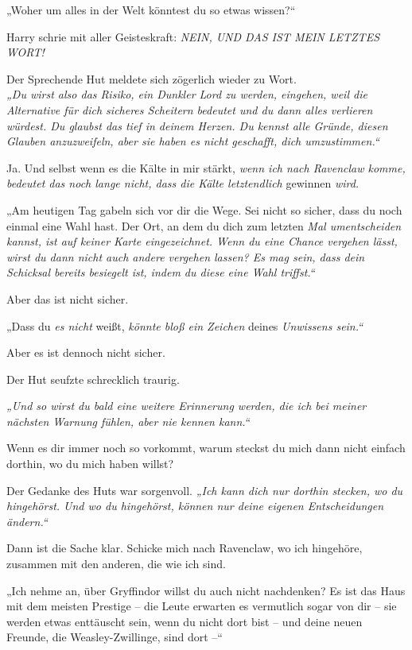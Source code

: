 {„Woher um alles in der Welt könntest du so etwas wissen?“

Harry schrie mit aller Geisteskraft: \emph{NEIN, UND DAS IST MEIN LETZTES WORT!}

Der Sprechende Hut meldete sich zögerlich wieder zu Wort.\\ \emph{„Du wirst also das Risiko, ein Dunkler Lord zu werden, eingehen, weil die Alternative für dich sicheres Scheitern bedeutet und du dann alles verlieren würdest. Du glaubst das tief in deinem Herzen. Du kennst alle Gründe, diesen Glauben anzuzweifeln, aber sie haben es nicht geschafft, dich umzustimmen.“}

Ja. Und selbst wenn es die Kälte in mir stärkt, \emph{wenn ich nach Ravenclaw komme, bedeutet das noch lange nicht, dass die Kälte letztendlich} gewinnen \emph{wird.}

„Am heutigen Tag gabeln sich vor dir die Wege. Sei nicht so sicher, dass du noch einmal eine Wahl hast. Der Ort, an dem du dich zum letzten \emph{Mal umentscheiden kannst, ist auf keiner Karte eingezeichnet. Wenn du eine Chance vergehen lässt, wirst du dann nicht auch andere vergehen lassen? Es mag sein, dass dein Schicksal bereits besiegelt ist, indem du diese eine Wahl triffst.“}

Aber das ist nicht sicher.

„Dass du \emph{es nicht} weißt, \emph{könnte bloß ein Zeichen} deines \emph{Unwissens sein.“}

Aber es ist dennoch nicht sicher.

Der Hut seufzte schrecklich traurig.

\emph{„Und so wirst du bald eine weitere Erinnerung werden, die ich bei meiner nächsten Warnung fühlen, aber nie kennen kann.“}

Wenn es dir immer noch so vorkommt, warum steckst du mich dann nicht einfach dorthin, wo du mich haben willst?

Der Gedanke des Huts war sorgenvoll. \emph{„Ich kann dich nur dorthin stecken, wo du hingehörst. Und wo du hingehörst, können nur deine eigenen Entscheidungen ändern.“}

Dann ist die Sache klar. Schicke mich nach Ravenclaw, wo ich hingehöre, zusammen mit den anderen, die wie ich sind.

„Ich nehme an, über Gryffindor willst du auch nicht nachdenken? Es ist das Haus mit dem meisten Prestige -- die Leute erwarten es vermutlich sogar von dir -- sie werden etwas enttäuscht sein, wenn du nicht dort bist -- und deine neuen Freunde, die Weasley-Zwillinge, sind dort --“

}
